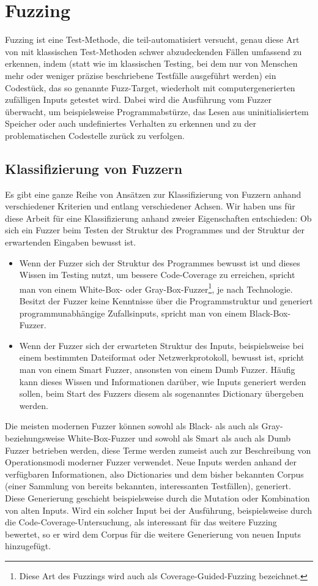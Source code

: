 \documentclass[a4paper]{article}
\begin{document}
\section{Fuzzing}
Fuzzing ist eine Test-Methode, die teil-automatisiert versucht, genau diese Art von mit klassischen Test-Methoden schwer abzudeckenden Fällen umfassend zu erkennen, indem (statt wie im klassischen Testing, bei dem nur von Menschen mehr oder weniger präzise beschriebene Testfälle ausgeführt werden) ein Codestück, das so genannte Fuzz-Target, wiederholt mit computergenerierten zufälligen Inputs getestet wird. 
Dabei wird die Ausführung vom Fuzzer überwacht, um beispielsweise Programmabstürze, das Lesen aus uninitialisiertem Speicher oder auch undefiniertes Verhalten zu erkennen und zu der problematischen Codestelle zurück zu verfolgen.

\subsection{Klassifizierung von Fuzzern}
Es gibt eine ganze Reihe von Ansätzen zur Klassifizierung von Fuzzern anhand verschiedener Kriterien und entlang verschiedener Achsen. Wir haben uns für diese Arbeit für eine Klassifizierung anhand zweier Eigenschaften entschieden: Ob sich ein Fuzzer beim Testen der Struktur des Programmes und der Struktur der erwartenden Eingaben bewusst ist.
\begin{itemize}
    \item Wenn der Fuzzer sich der Struktur des Programmes bewusst ist und dieses Wissen im Testing nutzt, um bessere Code-Coverage zu erreichen, spricht man von einem White-Box- oder Gray-Box-Fuzzer\footnote{Diese Art des Fuzzings wird auch als Coverage-Guided-Fuzzing bezeichnet.}, je nach Technologie.
        Besitzt der Fuzzer keine Kenntnisse über die Programmstruktur und generiert programmunabhängige Zufallsinputs, spricht man von einem Black-Box-Fuzzer.
    \item Wenn der Fuzzer sich der erwarteten Struktur des Inputs, beispielsweise bei einem bestimmten Dateiformat oder Netzwerkprotokoll, bewusst ist, spricht man von einem Smart Fuzzer, ansonsten von einem Dumb Fuzzer. Häufig kann dieses Wissen und Informationen darüber, wie Inputs generiert werden sollen, beim Start des Fuzzers diesem als sogenanntes Dictionary übergeben werden.
\end{itemize}
Die meisten modernen Fuzzer können sowohl als Black- als auch als Gray- beziehungsweise White-Box-Fuzzer und sowohl als Smart als auch als Dumb Fuzzer betrieben werden, diese Terme werden zumeist auch zur Beschreibung von Operationsmodi moderner Fuzzer verwendet. 
Neue Inputs werden anhand der verfügbaren Informationen, also Dictionaries und dem bisher bekannten Corpus (einer Sammlung von bereits bekannten, interessanten Testfällen), generiert. 
Diese Generierung geschieht beispielsweise durch die Mutation oder Kombination von alten Inputs.
Wird ein solcher Input bei der Ausführung, beispielsweise durch die Code-Coverage-Untersuchung, als interessant für das weitere Fuzzing bewertet, so er wird dem Corpus für die weitere Generierung von neuen Inputs hinzugefügt.
\end{document}
